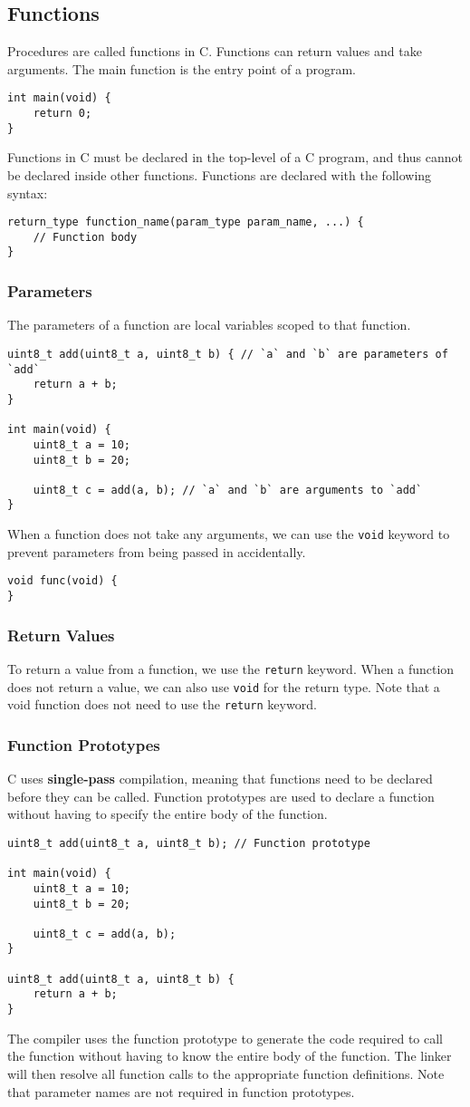 \documentclass{article}
\begin{document}
\subsection{Functions}
Procedures are called functions in C. Functions can return values and
take arguments. The main function is the entry point of a program.
\begin{verbatim}
int main(void) {
    return 0;
}
\end{verbatim}
Functions in C must be declared in the top-level of a C program, and
thus cannot be declared inside other functions. Functions are declared
with the following syntax:
\begin{verbatim}
return_type function_name(param_type param_name, ...) {
    // Function body
}
\end{verbatim}
\subsubsection{Parameters}
The parameters of a function are local variables scoped to that
function.
\begin{verbatim}
uint8_t add(uint8_t a, uint8_t b) { // `a` and `b` are parameters of `add`
    return a + b;
}

int main(void) {
    uint8_t a = 10;
    uint8_t b = 20;

    uint8_t c = add(a, b); // `a` and `b` are arguments to `add`
}
\end{verbatim}
When a function does not take any arguments, we can use the
\texttt{void} keyword to prevent parameters from being passed in
accidentally.
\begin{verbatim}
void func(void) {
}
\end{verbatim}
\subsubsection{Return Values}
To return a value from a function, we use the \texttt{return}
keyword. When a function does not return a value, we can also use
\texttt{void} for the return type. Note that a void function does
not need to use the \texttt{return} keyword.
\subsubsection{Function Prototypes}
C uses \textbf{single-pass} compilation, meaning that functions need to
be declared before they can be called. Function prototypes are used to
declare a function without having to specify the entire body of the
function.
\begin{verbatim}
uint8_t add(uint8_t a, uint8_t b); // Function prototype

int main(void) {
    uint8_t a = 10;
    uint8_t b = 20;

    uint8_t c = add(a, b);
}

uint8_t add(uint8_t a, uint8_t b) {
    return a + b;
}
\end{verbatim}
The compiler uses the function prototype to generate the code required
to call the function without having to know the entire body of the
function. The linker will then resolve all function calls to the
appropriate function definitions. Note that parameter names are not
required in function prototypes.
\end{document}
